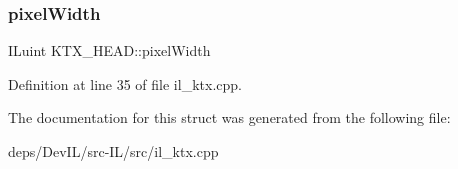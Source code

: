 \subsubsection{\texorpdfstring{pixel\+Width}{pixelWidth}}
{\footnotesize\ttfamily I\+Luint K\+T\+X\+\_\+\+H\+E\+A\+D\+::pixel\+Width}



Definition at line 35 of file il\+\_\+ktx.\+cpp.



The documentation for this struct was generated from the following file\+:\begin{DoxyCompactItemize}
\item 
deps/\+Dev\+I\+L/src-\/\+I\+L/src/il\+\_\+ktx.\+cpp\end{DoxyCompactItemize}

